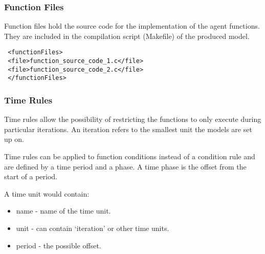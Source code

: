 % 
% 
% 

\subsubsection{Function Files}

Function files hold the source code for the implementation of the
agent functions.
They are included in the compilation script (Makefile) of the produced model.

\begin{mylisting}
\begin{verbatim}
 <functionFiles>
 <file>function_source_code_1.c</file>
 <file>function_source_code_2.c</file>
 </functionFiles>
\end{verbatim}
\end{mylisting}

\subsubsection{Time Rules}
\label{timeunit}

Time rules allow the possibility of restricting the functions to
only execute during particular iterations. An iteration refers to
the smallest unit the models are set up on.

Time rules can be applied to function conditions instead of a
condition rule and are defined by a time period and a phase. A time
phase is the offset from the start of a period.

A time unit would contain:
\begin{itemize}
\item name - name of the time unit.
\item unit - can contain `iteration' or other time units.
\item period - the possible offset.
\end{itemize}

